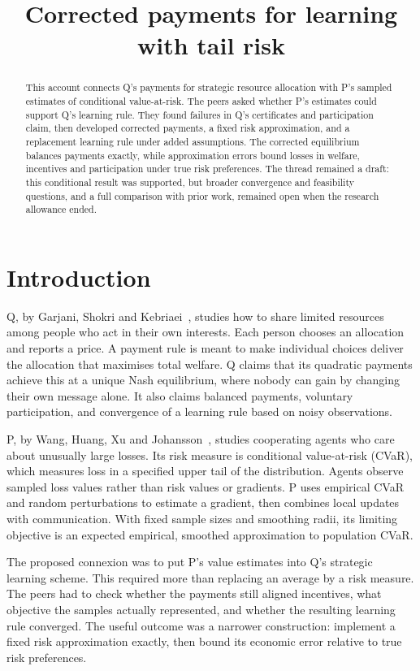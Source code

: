 \documentclass{article}
\title{Corrected payments for learning with tail risk}
\author{}
\date{}
\begin{document}
\maketitle
\begin{abstract}
This account connects Q's payments for strategic resource allocation with P's sampled estimates of conditional value-at-risk.
The peers asked whether P's estimates could support Q's learning rule.
They found failures in Q's certificates and participation claim, then developed corrected payments, a fixed
risk approximation, and a replacement learning rule under added assumptions.
The corrected equilibrium balances payments exactly, while approximation errors bound losses in welfare,
incentives and participation under true risk preferences.
The thread remained a draft: this conditional result was supported, but broader convergence and feasibility
questions, and a full comparison with prior work, remained open when the research allowance ended.
\end{abstract}

\section{Introduction}
Q, by Garjani, Shokri and Kebriaei~\cite{Q}, studies how to share limited resources among people who act in their own interests.
Each person chooses an allocation and reports a price.
A payment rule is meant to make individual choices deliver the allocation that maximises total welfare.
Q claims that its quadratic payments achieve this at a unique Nash equilibrium, where nobody can gain by changing their own message alone.
It also claims balanced payments, voluntary participation, and convergence of a learning rule based on noisy observations.

P, by Wang, Huang, Xu and Johansson~\cite{P}, studies cooperating agents who care about unusually large losses.
Its risk measure is conditional value-at-risk (CVaR), which measures loss in a specified upper tail of the distribution.
Agents observe sampled loss values rather than risk values or gradients.
P uses empirical CVaR and random perturbations to estimate a gradient, then combines local updates with communication.
With fixed sample sizes and smoothing radii, its limiting objective is an expected empirical, smoothed approximation to population CVaR.

The proposed connexion was to put P's value estimates into Q's strategic learning scheme.
This required more than replacing an average by a risk measure.
The peers had to check whether the payments still aligned incentives, what objective the samples actually
represented, and whether the resulting learning rule converged.
The useful outcome was a narrower construction: implement a fixed risk approximation exactly, then bound its
economic error relative to true risk preferences.
\end{document}
